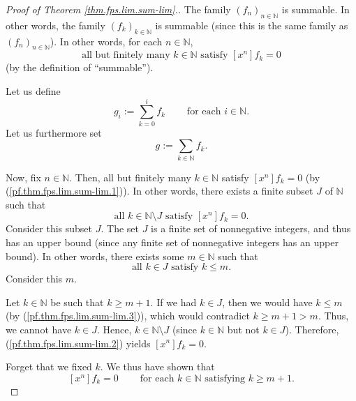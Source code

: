 \begin{fineprint}
\begin{proof}
[Proof of Theorem \ref{thm.fps.lim.sum-lim}.]The family $\left(  f_{n}\right)
_{n\in\mathbb{N}}$ is summable. In other words, the family $\left(
f_{k}\right)  _{k\in\mathbb{N}}$ is summable (since this is the same family as
$\left(  f_{n}\right)  _{n\in\mathbb{N}}$). In other words, for each
$n\in\mathbb{N}$,
\begin{equation}
\text{all but finitely many }k\in\mathbb{N}\text{ satisfy }\left[
x^{n}\right]  f_{k}=0 \label{pf.thm.fps.lim.sum-lim.1}%
\end{equation}
(by the definition of \textquotedblleft summable\textquotedblright).

Let us define%
\begin{equation}
g_{i}:=\sum_{k=0}^{i}f_{k}\ \ \ \ \ \ \ \ \ \ \text{for each }i\in\mathbb{N}.
\label{pf.thm.fps.lim.sum-lim.gi=}%
\end{equation}
Let us furthermore set%
\begin{equation}
g:=\sum_{k\in\mathbb{N}}f_{k}. \label{pf.thm.fps.lim.sum-lim.g=}%
\end{equation}


Now, fix $n\in\mathbb{N}$. Then, all but finitely many $k\in\mathbb{N}$
satisfy $\left[  x^{n}\right]  f_{k}=0$ (by (\ref{pf.thm.fps.lim.sum-lim.1})).
In other words, there exists a finite subset $J$ of $\mathbb{N}$ such that
\begin{equation}
\text{all }k\in\mathbb{N}\setminus J\text{ satisfy }\left[  x^{n}\right]
f_{k}=0. \label{pf.thm.fps.lim.sum-lim.2}%
\end{equation}
Consider this subset $J$. The set $J$ is a finite set of nonnegative integers,
and thus has an upper bound (since any finite set of nonnegative integers has
an upper bound). In other words, there exists some $m\in\mathbb{N}$ such that%
\begin{equation}
\text{all }k\in J\text{ satisfy }k\leq m. \label{pf.thm.fps.lim.sum-lim.3}%
\end{equation}
Consider this $m$.

Let $k\in\mathbb{N}$ be such that $k\geq m+1$. If we had $k\in J$, then we
would have $k\leq m$ (by (\ref{pf.thm.fps.lim.sum-lim.3})), which would
contradict $k\geq m+1>m$. Thus, we cannot have $k\in J$. Hence, $k\in
\mathbb{N}\setminus J$ (since $k\in\mathbb{N}$ but not $k\in J$). Therefore,
(\ref{pf.thm.fps.lim.sum-lim.2}) yields $\left[  x^{n}\right]  f_{k}=0$.

Forget that we fixed $k$. We thus have shown that%
\begin{equation}
\left[  x^{n}\right]  f_{k}=0\ \ \ \ \ \ \ \ \ \ \text{for each }%
k\in\mathbb{N}\text{ satisfying }k\geq m+1. \label{pf.thm.fps.lim.sum-lim.4}%
\end{equation}



\end{proof}
\end{fineprint}

